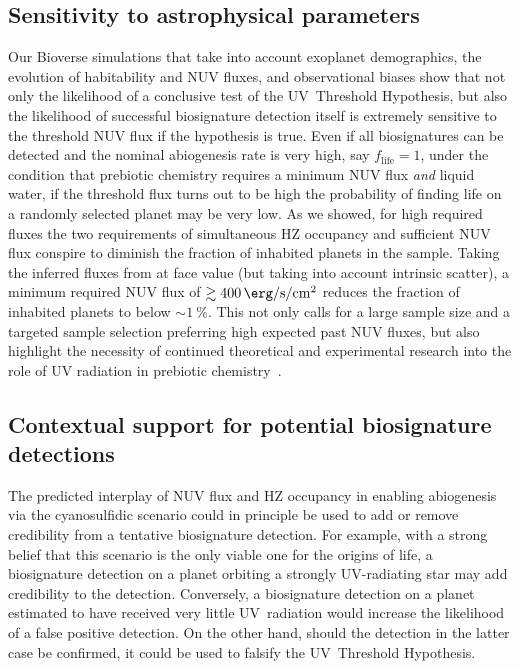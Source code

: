 \documentclass[twocolumn,twocolappendix,linenumbers]{aastex631}
\begin{document}
\subsection{Sensitivity to astrophysical parameters} %
Our Bioverse simulations that take into account exoplanet demographics, the evolution of habitability and \gls{NUV} fluxes, and observational biases show that not only the likelihood of a conclusive test of the UV~Threshold Hypothesis, but also the likelihood of successful biosignature detection itself is extremely sensitive to the threshold \gls{NUV} flux if the hypothesis is true.
Even if all biosignatures can be detected and the nominal abiogenesis rate is very high, say $f_\mathrm{life} = 1$, under the condition that prebiotic chemistry requires a minimum \gls{NUV} flux \textit{and} liquid water, if the threshold flux turns out to be high the probability of finding life on a randomly selected planet may be very low.
As we showed, for high required fluxes the two requirements of simultaneous \gls{HZ} occupancy and sufficient \gls{NUV} flux conspire to diminish the fraction of inhabited planets in the sample.
Taking the inferred fluxes from \citet{Richey-Yowell2023} at face value (but taking into account intrinsic scatter), a minimum required \gls{NUV} flux of $\gtrsim\SI{400}{\erg\per\second\per\centi\meter\squared}$ reduces the fraction of inhabited planets to below $\sim\SI{1}{\percent}$.
This not only calls for a large sample size and a targeted sample selection preferring high expected past \gls{NUV} fluxes, but also highlight the necessity of continued theoretical and experimental research into the role of UV radiation in prebiotic chemistry~\citep{Ranjan2017b,Rimmer2018,Rimmer2021}.





\subsection{Contextual support for potential biosignature detections} %
The predicted interplay of \gls{NUV} flux and \gls{HZ} occupancy in enabling abiogenesis via the cyanosulfidic scenario could in principle be used to add or remove credibility from a tentative biosignature detection.
For example, with a strong belief that this scenario is the only viable one for the origins of life, a biosignature detection on a planet orbiting a strongly UV-radiating star may add credibility to the detection.
Conversely, a biosignature detection on a planet estimated to have received very little UV~radiation would increase the likelihood of a false positive detection.
On the other hand, should the detection in the latter case be confirmed, it could be used to falsify the UV~Threshold Hypothesis.
\end{document}
